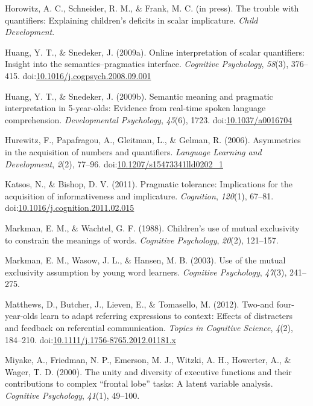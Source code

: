 \documentclass[man]{apa6}
\theoremstyle{definition}
\theoremstyle{definition}
\theoremstyle{definition}
\theoremstyle{remark}
\begin{document}
\hypertarget{ref-horowitzSchneider}{}
Horowitz, A. C., Schneider, R. M., \& Frank, M. C. (in press). The
trouble with quantifiers: Explaining children's deficits in scalar
implicature. \emph{Child Development}.

\hypertarget{ref-huang2009a}{}
Huang, Y. T., \& Snedeker, J. (2009a). Online interpretation of scalar
quantifiers: Insight into the semantics--pragmatics interface.
\emph{Cognitive Psychology}, \emph{58}(3), 376--415.
doi:\href{https://doi.org/10.1016/j.cogpsych.2008.09.001}{10.1016/j.cogpsych.2008.09.001}

\hypertarget{ref-huang2009b}{}
Huang, Y. T., \& Snedeker, J. (2009b). Semantic meaning and pragmatic
interpretation in 5-year-olds: Evidence from real-time spoken language
comprehension. \emph{Developmental Psychology}, \emph{45}(6), 1723.
doi:\href{https://doi.org/10.1037/a0016704}{10.1037/a0016704}

\hypertarget{ref-hurewitz2006}{}
Hurewitz, F., Papafragou, A., Gleitman, L., \& Gelman, R. (2006).
Asymmetries in the acquisition of numbers and quantifiers.
\emph{Language Learning and Development}, \emph{2}(2), 77--96.
doi:\href{https://doi.org/10.1207/s15473341lld0202_1}{10.1207/s15473341lld0202\_1}

\hypertarget{ref-katsos2011}{}
Katsos, N., \& Bishop, D. V. (2011). Pragmatic tolerance: Implications
for the acquisition of informativeness and implicature.
\emph{Cognition}, \emph{120}(1), 67--81.
doi:\href{https://doi.org/10.1016/j.cognition.2011.02.015}{10.1016/j.cognition.2011.02.015}

\hypertarget{ref-markman1988children}{}
Markman, E. M., \& Wachtel, G. F. (1988). Children's use of mutual
exclusivity to constrain the meanings of words. \emph{Cognitive
Psychology}, \emph{20}(2), 121--157.

\hypertarget{ref-markman2003use}{}
Markman, E. M., Wasow, J. L., \& Hansen, M. B. (2003). Use of the mutual
exclusivity assumption by young word learners. \emph{Cognitive
Psychology}, \emph{47}(3), 241--275.

\hypertarget{ref-matthews2012}{}
Matthews, D., Butcher, J., Lieven, E., \& Tomasello, M. (2012). Two-and
four-year-olds learn to adapt referring expressions to context: Effects
of distracters and feedback on referential communication. \emph{Topics
in Cognitive Science}, \emph{4}(2), 184--210.
doi:\href{https://doi.org/10.1111/j.1756-8765.2012.01181.x}{10.1111/j.1756-8765.2012.01181.x}

\hypertarget{ref-miyake2000unity}{}
Miyake, A., Friedman, N. P., Emerson, M. J., Witzki, A. H., Howerter,
A., \& Wager, T. D. (2000). The unity and diversity of executive
functions and their contributions to complex ``frontal lobe'' tasks: A
latent variable analysis. \emph{Cognitive Psychology}, \emph{41}(1),
49--100.
\end{document}

